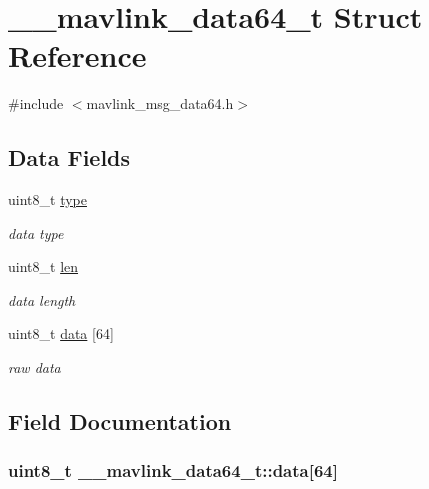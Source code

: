\hypertarget{struct____mavlink__data64__t}{\section{\+\_\+\+\_\+mavlink\+\_\+data64\+\_\+t Struct Reference}
\label{struct____mavlink__data64__t}
}


{\ttfamily \#include $<$mavlink\+\_\+msg\+\_\+data64.\+h$>$}

\subsection*{Data Fields}
\begin{DoxyCompactItemize}
\item 
uint8\+\_\+t \hyperlink{struct____mavlink__data64__t_aa716605f866562431612719b0c4ffa75}{type}
\begin{DoxyCompactList}\small\item\em data type \end{DoxyCompactList}\item 
uint8\+\_\+t \hyperlink{struct____mavlink__data64__t_ae4939d93f19a8337a5a333351ee88c7d}{len}
\begin{DoxyCompactList}\small\item\em data length \end{DoxyCompactList}\item 
uint8\+\_\+t \hyperlink{struct____mavlink__data64__t_ac9e67276a8e8e7da092bb3328d342448}{data} \mbox{[}64\mbox{]}
\begin{DoxyCompactList}\small\item\em raw data \end{DoxyCompactList}\end{DoxyCompactItemize}


\subsection{Field Documentation}
\hypertarget{struct____mavlink__data64__t_ac9e67276a8e8e7da092bb3328d342448}{
\subsubsection[{data}]{\setlength{\rightskip}{0pt plus 5cm}uint8\+\_\+t \+\_\+\+\_\+mavlink\+\_\+data64\+\_\+t\+::data\mbox{[}64\mbox{]}}}\label{struct____mavlink__data64__t_ac9e67276a8e8e7da092bb3328d342448}


